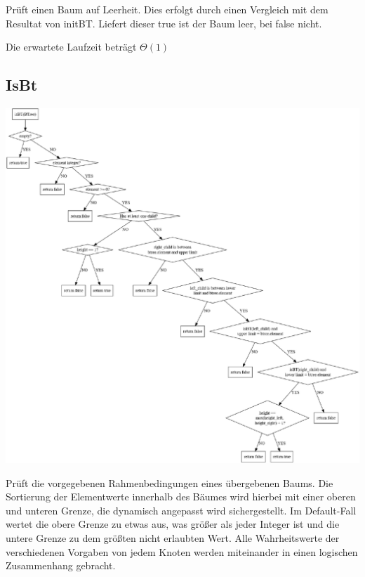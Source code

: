 \documentclass[11pt]{article}
\begin{document}
    Prüft einen Baum auf Leerheit.
    Dies erfolgt durch einen Vergleich mit dem Resultat von
    initBT. Liefert dieser true ist der Baum leer, bei false
    nicht.

    Die erwartete Laufzeit beträgt
    \begin{math}
        \Theta(1)
    \end{math}

    \subsection{IsBt}\label{subsec:isbt}

    \begin{center}
        \includegraphics[width=1.2\columnwidth] {isbt.pdf}
    \end{center}

    Prüft die vorgegebenen Rahmenbedingungen eines übergebenen Baums.
    Die Sortierung der Elementwerte innerhalb des Bäumes wird hierbei mit einer
    oberen und unteren Grenze, die dynamisch angepasst wird sichergestellt.
    Im Default-Fall wertet die obere Grenze zu etwas aus,
    was größer als jeder Integer ist und die untere Grenze zu dem größten nicht erlaubten Wert.
    Alle Wahrheitswerte der verschiedenen
    Vorgaben von jedem Knoten werden miteinander in einen logischen
    Zusammenhang gebracht.
\end{document}
